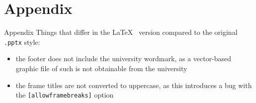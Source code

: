 \documentclass[noserifmath,aspectratio=169]{beamer}
\begin{document}
\section{Appendix}
\begin{frame}{Appendix}
    Things that differ in the \LaTeX~ version compared to the original \texttt{.pptx} style:
        \begin{itemize}
            \item the footer does not include the university wordmark, as a vector-based graphic file of such is not obtainable from the university
            \item the frame titles are not converted to uppercase, as this introduces a bug with the \texttt{[allowframebreaks]} option
        \end{itemize}
\end{frame}
\end{document}

